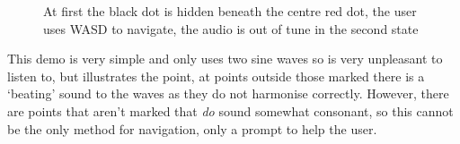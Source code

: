 \begin{figure}[H]
\centering
{}%
\hspace*{2cm}%
\caption{At first the black dot is hidden beneath the centre red dot, the user uses WASD to navigate,
the audio is out of tune in the second state}
\end{figure}

This demo is very simple and only uses two sine waves so is very unpleasant to
listen to, but illustrates the point, at points outside those marked there is a
`beating' sound to the waves as they do not harmonise correctly. However, there
are points that aren't marked that \emph{do} sound somewhat consonant, so this
cannot be the only method for navigation, only a prompt to help the user.
